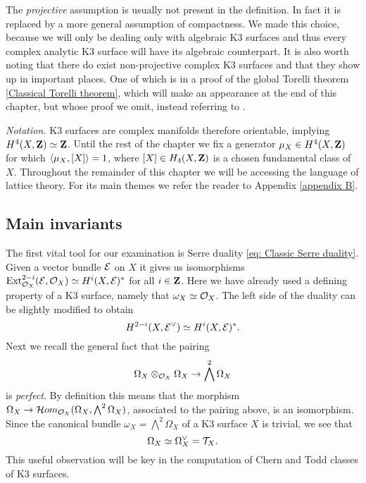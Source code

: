 \begin{remark}
    The \emph{projective} assumption is usually not present in the definition. In fact it is replaced by a more general assumption of compactness. We made this choice, because we will only be dealing only with algebraic K3 surfaces and thus every complex analytic K3 surface will have its algebraic counterpart. It is also worth noting that there do exist non-projective complex K3 surfaces and that they show up in important places. One of which is in a proof of the global Torelli theorem \ref{Classical Torelli theorem}, which will make an appearance at the end of this chapter, but whose proof we omit, instead referring to \cite[\S 7]{Huybrechts2016}. 
\end{remark}









\noindent
\textsl{Notation.}
K3 surfaces are complex manifolds therefore orientable, implying $H^{4}(X, \mathbf Z) \simeq \mathbf Z$. Until the rest of the chapter we fix a generator $\mu_X \in H^{4}(X, \mathbf Z)$ for which $\langle \mu_X, [X] \rangle = 1$, where $[X] \in H_4(X, \mathbf Z)$ is a chosen fundamental class of $X$. Throughout the remainder of this chapter we will be accessing the language of lattice theory. For its main themes we refer the reader to Appendix \ref{appendix B}.

\subsection{Main invariants}

The first vital tool for our examination is Serre duality \eqref{eq: Classic Serre duality}. Given a vector bundle $\mathcal E$ on $X$ it gives us isomorphisms $\operatorname{Ext}_{{\mathcal{O}_{X}}}^{2-i}(\mathcal E, {\mathcal{O}_{X}}) \simeq H^{i}(X, \mathcal E)^*$ for all $i \in \mathbf Z$. Here we have already used a defining property of a K3 surface, namely that $\omega_X \simeq {\mathcal{O}_{X}}$. The left side of the duality can be slightly modified to obtain 
\begin{equation}
    \label{eq: Serre duality on K3}
    H^{2-i}(X, \mathcal E^\vee) \simeq H^{i}(X, \mathcal E)^*.
\end{equation}
Next we recall the general fact that the pairing
\[
    \Omega_X \otimes_{\mathcal{O}_{X}} \Omega_X \to \bigwedge^2\Omega_X
\]
is \emph{perfect}. By definition this means that the morphism $\Omega_X \to \localhom[X](\Omega_X, \bigwedge^2 \Omega_X)$, associated to the pairing above, is an isomorphism. Since the canonical bundle $\omega_X = \bigwedge^2 \Omega_X$ of a K3 surface $X$ is trivial, we see that 
\[
    \Omega_X \simeq \Omega_X^\vee = \mathcal{T}_{X}.
\]
This useful observation will be key in the computation of Chern and Todd classes of K3 surfaces. 

